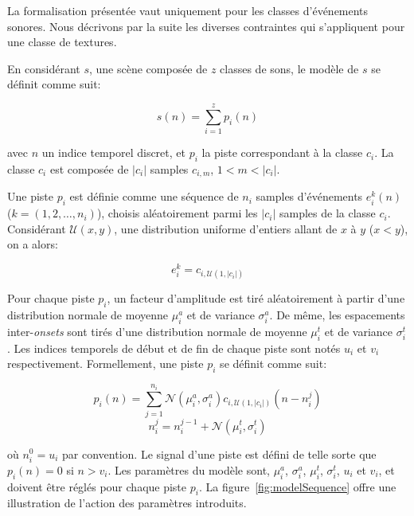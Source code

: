 La formalisation présentée vaut uniquement pour les classes d'événements sonores. Nous décrivons par la suite les diverses contraintes qui s'appliquent pour une classe de textures.
 
En considérant $s$, une scène composée de $z$ classes de sons, le modèle de $s$ se définit comme suit:
 
 \begin{equation}
 s(n)=\sum_{i=1}^{z}p_i(n)
 \end{equation}

avec $n$ un indice temporel discret, et $p_i$ la piste correspondant à la classe $c_i$. La classe $c_i$ est composée de $\vert c_i\vert$ samples $c_{i,m}$, $1<m<\vert c_i\vert$. 

Une piste $p_i$ est définie comme une séquence de $n_i$ samples d'événements $e^k_i(n)$ ($k=(1,2,\ldots,n_i)$), choisis aléatoirement parmi les $\vert c_i\vert$ samples de la classe $c_i$. Considérant $\mathcal{U}(x,y)$, une distribution uniforme d'entiers allant de $x$ à $y$ ($x<y$), on a alors:

 \begin{equation}
 e^k_i=c_{i,\mathcal{U}(1,\vert c_i \vert)}
 \end{equation}

 Pour chaque piste $p_i$, un facteur d'amplitude est tiré aléatoirement à partir d'une distribution normale de moyenne $\mu^a_i$ et de variance $\sigma^a_i$. De même, les espacements inter-\emph{onsets} sont tirés d'une distribution normale de moyenne $\mu^t_i$ et de variance $\sigma^t_i$. Les indices temporels de début et de fin de chaque piste sont notés $u_i$ et $v_i$ respectivement. Formellement, une piste $p_i$ se définit comme suit:
 
\begin{equation}
\label{eq:ch4_eq1}
p_{i}(n)= \sum_{j=1}^{n_i} \mathcal{N}(\mu^a_{i},\sigma^a_{i})c_{i, \mathcal{U} (1, |c_i|)}(n-n^j_i)
\end{equation}
\begin{equation}
\label{eq:ch4_eq2}
n_i^j=n_i^{j-1} + \mathcal{N}({\mu^t_{i},\sigma^t_{i}})
\end{equation}

où $n_i^0=u_i$ par convention. Le signal d'une piste est défini de telle sorte que $p_i(n)=0$ si $n>v_i$. Les paramètres du modèle sont, $\mu^a_i$,  $\sigma^a_i$,   $\mu^t_i$,  $\sigma^t_i$, $u_i$ et $v_i$, et doivent être réglés pour chaque piste $p_i$. La figure~\ref{fig:modelSequence} offre une illustration de l'action des paramètres introduits.


